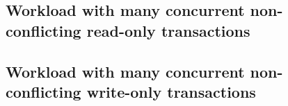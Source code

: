 \documentclass[main.tex]{subfiles}
\begin{document}
\subsection{Workload with many concurrent non-conflicting read-only transactions}

\subsection{Workload with many concurrent non-conflicting write-only transactions}
\end{document}
